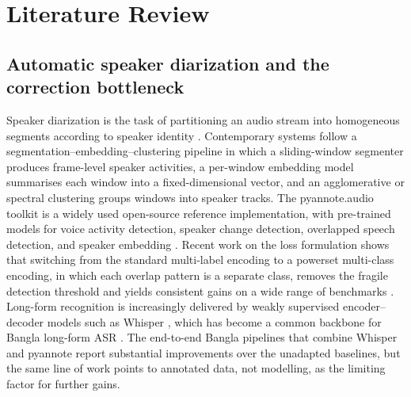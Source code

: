 \documentclass[10pt,a4paper,twocolumn]{article}
\begin{document}
\section{Literature Review}\label{sec:lit}

\subsection{Automatic speaker diarization and the correction
  bottleneck}
\label{sec:lit-diarization}

Speaker diarization is the task of partitioning an audio stream
into homogeneous segments according to speaker identity
\citep{bredin2020pyannote}. Contemporary systems follow a
segmentation--embedding--clustering pipeline in which a
sliding-window segmenter produces frame-level speaker
activities, a per-window embedding model summarises each
window into a fixed-dimensional vector, and an agglomerative
or spectral clustering groups windows into speaker tracks. The
pyannote.audio toolkit is a widely used open-source
reference implementation, with pre-trained models for voice
activity detection, speaker change detection, overlapped speech
detection, and speaker embedding \citep{bredin2020pyannote}.
Recent work on the loss formulation shows that switching from
the standard multi-label encoding to a powerset multi-class
encoding, in which each overlap pattern is a separate class,
removes the fragile detection threshold and yields consistent
gains on a wide range of benchmarks \citep{plaquet2023powerset}.
Long-form recognition is increasingly delivered by weakly
supervised encoder--decoder models such as Whisper
\citep{radford2023whisper}, which has become a common backbone
for Bangla long-form ASR \citep{bhuiyan2026banglawsd}. The
end-to-end Bangla pipelines that combine Whisper and pyannote
report substantial improvements over the unadapted baselines,
but the same line of work points to annotated data, not
modelling, as the limiting factor for further gains.
\end{document}
